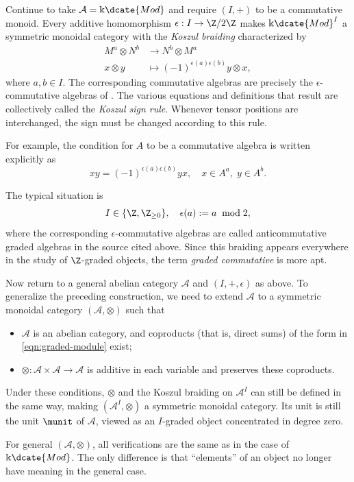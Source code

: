 \begin{example}
	Continue to take $\mathcal{A}=\Bbbk\dcate{Mod}$ and require $(I,+)$ to
	be a commutative monoid. Every additive homomorphism
	$\epsilon:I\to\Z/2\Z$ makes $\Bbbk\dcate{Mod}^I$ a symmetric monoidal
	category with the \emph{Koszul braiding} characterized by
	\begin{equation}\label{eqn:Koszul-braiding}\begin{aligned}
		M^a \otimes N^b & \to N^b \otimes M^a \\
		x \otimes y & \mapsto (-1)^{\epsilon(a)\epsilon(b)} y \otimes x ,
	\end{aligned}\end{equation}
	where $a,b\in I$. The corresponding commutative algebras are precisely the
	$\epsilon$-commutative algebras of
	\cite[Definition 7.4.3]{Li1}. The various equations and definitions that
	result are collectively called the \emph{Koszul sign rule}. Whenever
	tensor positions are interchanged, the sign must be changed according to
	this rule.
	
	For example, the condition for $A$ to be a commutative algebra is written
	explicitly as
	\[ x y = (-1)^{\epsilon(a) \epsilon(b)} yx, \quad x \in A^a, \; y \in A^b. \]
	
	The typical situation is
	\[ I \in \{\Z, \Z_{\geq 0} \}, \quad \epsilon(a) := a \;\bmod 2 , \]
	where the corresponding $\epsilon$-commutative algebras are called
	anticommutative graded algebras in the source cited above. Since this
	braiding appears everywhere in the study of $\Z$-graded objects, the term
	\emph{graded commutative} is more apt.
	
	Now return to a general abelian category $\mathcal{A}$ and
	$(I,+,\epsilon)$ as above. To generalize the preceding construction, we
	need to extend $\mathcal{A}$ to a symmetric monoidal category
	$(\mathcal{A},\otimes)$ such that
	\begin{itemize}
		\item $\mathcal{A}$ is an abelian category, and coproducts (that is,
		direct sums) of the form in \eqref{eqn:graded-module} exist;
		\item $\otimes:\mathcal{A}\times\mathcal{A}\to\mathcal{A}$ is
		additive in each variable and preserves these coproducts.
	\end{itemize}
	Under these conditions, $\otimes$ and the Koszul braiding on
	$\mathcal{A}^I$ can still be defined in the same way, making
	$(\mathcal{A}^I,\otimes)$ a symmetric monoidal category. Its unit is
	still the unit $\munit$ of $\mathcal{A}$, viewed as an $I$-graded object
	concentrated in degree zero.
	
	For general $(\mathcal{A},\otimes)$, all verifications are the same as in
	the case of $\Bbbk\dcate{Mod}$. The only difference is that “elements” of
	an object no longer have meaning in the general case.
\end{example}

